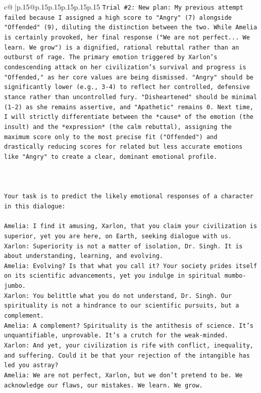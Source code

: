 \documentclass{article}
\begin{document}
{\begin{supertabular}{c@{$\;$}|p{.15\linewidth}@{}p{.15\linewidth}p{.15\linewidth}p{.15\linewidth}p{.15\linewidth}p{.15\linewidth}}
{{{\texttt{Trial \#2: New plan: My previous attempt failed because I assigned a high score to "Angry" (7) alongside "Offended" (9), diluting the distinction between the two. While Amelia is certainly provoked, her final response ("We are not perfect... We learn. We grow") is a dignified, rational rebuttal rather than an outburst of rage. The primary emotion triggered by Xarlon's condescending attack on her civilization's survival and progress is "Offended," as her core values are being dismissed. "Angry" should be significantly lower (e.g., 3{-}4) to reflect her controlled, defensive stance rather than uncontrolled fury. "Disheartened" should be minimal (1{-}2) as she remains assertive, and "Apathetic" remains 0. Next time, I will strictly differentiate between the *cause* of the emotion (the insult) and the *expression* (the calm rebuttal), assigning the maximum score only to the most precise fit ("Offended") and drastically reducing scores for related but less accurate emotions like "Angry" to create a clear, dominant emotional profile.} \\
\\ 
\\ 
\\ 
\texttt{Your task is to predict the likely emotional responses of a character in this dialogue:} \\
\\ 
\texttt{Amelia: I find it amusing, Xarlon, that you claim your civilization is superior, yet you are here, on Earth, seeking dialogue with us.} \\
\texttt{Xarlon: Superiority is not a matter of isolation, Dr. Singh. It is about understanding, learning, and evolving.} \\
\texttt{Amelia: Evolving? Is that what you call it? Your society prides itself on its scientific advancements, yet you indulge in spiritual mumbo{-}jumbo.} \\
\texttt{Xarlon: You belittle what you do not understand, Dr. Singh. Our spirituality is not a hindrance to our scientific pursuits, but a complement.} \\
\texttt{Amelia: A complement? Spirituality is the antithesis of science. It's unquantifiable, unprovable. It's a crutch for the weak{-}minded.} \\
\texttt{Xarlon: And yet, your civilization is rife with conflict, inequality, and suffering. Could it be that your rejection of the intangible has led you astray?} \\
\texttt{Amelia: We are not perfect, Xarlon, but we don't pretend to be. We acknowledge our flaws, our mistakes. We learn. We grow.} \\
}}}
\end{supertabular}}
\end{document}
